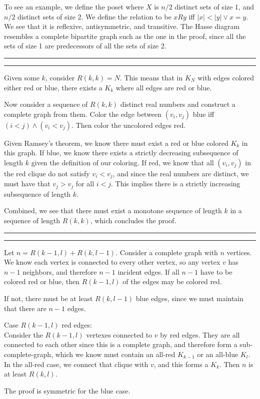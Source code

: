 \documentclass[11pt,letterpaper]{article}
\newcommand{\question}[1] {\vspace{.25in} \hrule\vspace{0.5em}
\noindent{\bf #1} \vspace{0.5em}
\hrule \vspace{.10in}}
\begin{document}
To see an example, we define the poset where $X$ is $n/2$ distinct sets of size 1, and $n/2$ distinct sets of size 2.
We define the relation to be $xRy$ iff $|x| < |y| \vee x = y$. We see that it is reflexive, antisymmetric, and transitive.
The Hasse diagram resembles a complete bipartite graph such as the one in the proof,
since all the sets of size 1 are predecessors of all the sets of size 2.

\question{3}
Given some $k$, consider $R(k,k) = N$. This means that in $K_{N}$ with edges colored either red or blue,
there exists a $K_k$ where all edges are red or blue.

Now consider a sequence of $R(k,k)$ distinct real numbers and construct a complete graph from them.
Color the edge between $(v_i, v_j)$ blue iff $(i < j) \wedge (v_i < v_j)$.
Then color the uncolored edges red.

Given Ramsey's theorem, we know there must exist a red or blue colored $K_k$ in this graph.
If blue, we know there exists a strictly decreasing subsequence of length $k$ given the definition of our coloring.
If red, we know that all $(v_i, v_j)$ in the red clique do not satisfy $v_i < v_j$,
and since the real numbers are distinct, we must have that $v_j > v_j$ for all $i < j$.
This implies there is a strictly increasing subsequence of length $k$.

Combined, we see that there must exist a monotone sequence of length $k$
in a sequence of length $R(k, k)$, which concludes the proof.

\question{4}
Let $n = R(k-1, l) + R(k, l-1)$. Consider a complete graph with $n$ vertices.
We know each vertex is connected to every other vertex, so any vertex $v$ has $n-1$ neighbors,
and therefore $n-1$ incident edges. If all $n-1$ have to be colored red or blue,
then $R(k-1, l)$ of the edges may be colored red.

If not, there must be at least $R(k, l-1)$ blue edges, since we must maintain that there are $n-1$ edges.

Case $R(k-1, l)$ red edges:\\
Consider the $R(k-1, l)$ vertexes connected to $v$ by red edges. They are all connected to each other since
this is a complete graph, and therefore form a sub-complete-graph, which we know must contain an all-red $K_{k-1}$ or an all-blue $K_{l}$.
In the all-red case, we connect that clique with $v$, and this forms a $K_{k}$. Then $n$ is at least $R(k, l)$.

The proof is symmetric for the blue case.
\end{document}
